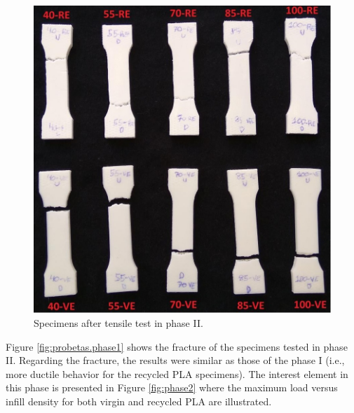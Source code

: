 \documentclass[conference,final,]{IEEEtran}
\begin{document}
\begin{figure}

{\centering \includegraphics[width=0.8\linewidth]{Figures/Probetas-Fase-2} 

}

\caption{Specimens after tensile test in  phase II. \label{fig:probetas.phase1}}\label{fig:Fig.Probetas.Fase.2}
\end{figure}

Figure \ref{fig:probetas.phase1} shows the fracture of the specimens
tested in phase II. Regarding the fracture, the results were similar as
those of the phase I (i.e., more ductile behavior for the recycled PLA
specimens). The interest element in this phase is presented in Figure
\ref{fig:phase2} where the maximum load versus infill density for both
virgin and recycled PLA are illustrated.
\end{document}
